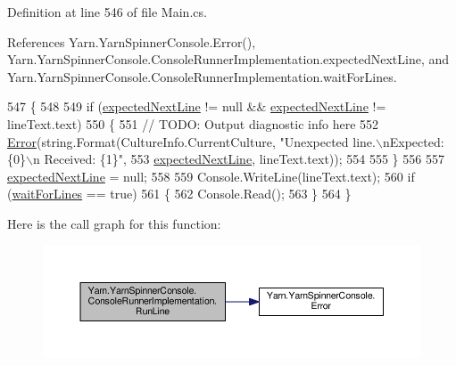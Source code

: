 Definition at line 546 of file Main.\-cs.



References Yarn.\-Yarn\-Spinner\-Console.\-Error(), Yarn.\-Yarn\-Spinner\-Console.\-Console\-Runner\-Implementation.\-expected\-Next\-Line, and Yarn.\-Yarn\-Spinner\-Console.\-Console\-Runner\-Implementation.\-wait\-For\-Lines.


\begin{DoxyCode}
547             \{
548 
549                 \textcolor{keywordflow}{if} (\hyperlink{a00056_a33a44e39f2d90850cee234dfad50f2c5}{expectedNextLine} != null && \hyperlink{a00056_a33a44e39f2d90850cee234dfad50f2c5}{expectedNextLine} != 
      lineText.text)
550                 \{
551                     \textcolor{comment}{// TODO: Output diagnostic info here}
552                     \hyperlink{a00195_a2f63f9f5b7634cb50ee75ff2eb18b137}{Error}(\textcolor{keywordtype}{string}.Format(CultureInfo.CurrentCulture, \textcolor{stringliteral}{"Unexpected line.\(\backslash\)nExpected: \{0\}\(\backslash\)n
      Received: \{1\}"},
553                         \hyperlink{a00056_a33a44e39f2d90850cee234dfad50f2c5}{expectedNextLine}, lineText.text));
554 
555                 \}
556 
557                 \hyperlink{a00056_a33a44e39f2d90850cee234dfad50f2c5}{expectedNextLine} = null;
558 
559                 Console.WriteLine(lineText.text);
560                 \textcolor{keywordflow}{if} (\hyperlink{a00056_a90b0c755ea1d2f3ffaffa6cf18266709}{waitForLines} == \textcolor{keyword}{true})
561                 \{
562                     Console.Read();
563                 \}
564             \}
\end{DoxyCode}


Here is the call graph for this function\-:
\nopagebreak
\begin{figure}[H]
\begin{center}
\leavevmode
\includegraphics[width=350pt]{a00056_a13bc6c3a8ba43223a20befae50dbbcb4_cgraph}
\end{center}
\end{figure}


